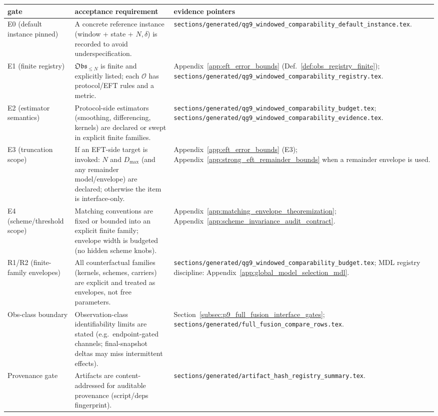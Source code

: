 \begin{center}
\scriptsize
\setlength{\tabcolsep}{6pt}
\renewcommand{\arraystretch}{1.15}
\begin{tabular}{p{} p{} p{}}
\toprule
gate & acceptance requirement & evidence pointers \\
\midrule
E0 (default instance pinned) & A concrete reference instance (window + state + $N,\delta$) is recorded to avoid underspecification. & \texttt{sections/generated/qg9\_windowed\_comparability\_default\_instance.tex}. \\
E1 (finite registry) & $\mathfrak{Obs}_{\le N}$ is finite and explicitly listed; each $\mathcal{O}$ has protocol/EFT rules and a metric. & Appendix~\ref{app:eft_error_bounds} (Def.~\ref{def:obs_registry_finite}); \texttt{sections/generated/qg9\_windowed\_comparability\_registry.tex}. \\
E2 (estimator semantics) & Protocol-side estimators (smoothing, differencing, kernels) are declared or swept in explicit finite families. & \texttt{sections/generated/qg9\_windowed\_comparability\_budget.tex}; \texttt{sections/generated/qg9\_windowed\_comparability\_evidence.tex}. \\
E3 (truncation scope) & If an EFT-side target is invoked: $N$ and $D_{\max}$ (and any remainder model/envelope) are declared; otherwise the item is interface-only. & Appendix~\ref{app:eft_error_bounds} (E3); Appendix~\ref{app:strong_eft_remainder_bounds} when a remainder envelope is used. \\
E4 (scheme/threshold scope) & Matching conventions are fixed or bounded into an explicit finite family; envelope width is budgeted (no hidden scheme knobs). & Appendix~\ref{app:matching_envelope_theoremization}; Appendix~\ref{app:scheme_invariance_audit_contract}. \\
R1/R2 (finite-family envelopes) & All counterfactual families (kernels, schemes, carriers) are explicit and treated as envelopes, not free parameters. & \texttt{sections/generated/qg9\_windowed\_comparability\_budget.tex}; MDL registry discipline: Appendix~\ref{app:global_model_selection_mdl}. \\
Obs-class boundary & Observation-class identifiability limits are stated (e.g.\ endpoint-gated channels; final-snapshot deltas may miss intermittent effects). & Section~\ref{subsec:p9_full_fusion_interface_gates}; \texttt{sections/generated/full\_fusion\_compare\_rows.tex}. \\
Provenance gate & Artifacts are content-addressed for auditable provenance (script/deps fingerprint). & \texttt{sections/generated/artifact\_hash\_registry\_summary.tex}. \\
\bottomrule
\end{tabular}
\end{center}